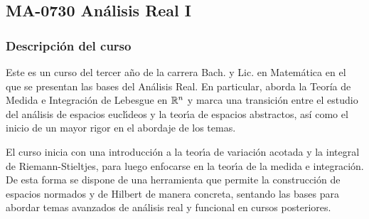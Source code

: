 \newpage
\subsection*{MA-0730 Análisis Real I}

\hypertarget{MA0730}{}
\begin{refsection}
\begin{table}[H]
\end{table}



\subsubsection*{Descripción del curso}

Este es un curso del tercer año de la carrera Bach. y Lic. en Matemática en el que se presentan las bases del Análisis Real. En particular, aborda la Teoría de Medida e Integración de Lebesgue en $\mathbb{R}^n$ y marca una transici\'{o}n entre el estudio del an\'{a}lisis de espacios eucl\'{\i}deos y la teor\'{\i}a de espacios abstractos, así como el inicio de un mayor rigor en el abordaje de los temas. 

El curso inicia con una introducci\'{o}n a la teor\'{\i}a de variación acotada y la integral de Riemann-Stieltjes, para luego enfocarse en la teor\'{\i}a de la medida e integraci\'{o}n. De esta forma se
dispone de una herramienta que permite la construcci\'{o}n de espacios normados y de Hilbert de manera concreta, sentando las bases para abordar temas avanzados de an\'{a}lisis real y funcional en cursos posteriores.


\end{refsection}
